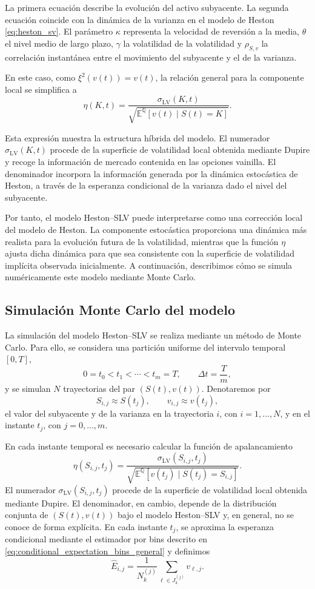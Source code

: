La primera ecuación describe la evolución del activo subyacente. La segunda ecuación coincide con la dinámica de la varianza en el modelo de Heston \ref{eq:heston_sv}. El parámetro \(\kappa\) representa la velocidad de reversión a la media, \(\theta\) el nivel medio de largo plazo, \(\gamma\) la volatilidad de la volatilidad y \(\rho_{S,v}\) la correlación instantánea entre el movimiento del subyacente y el de la varianza.

En este caso, como \(\xi^2(v(t))=v(t)\), la relación general para la componente local se simplifica a
\begin{equation}
\label{eq:heston_slv_leverage}
\eta(K,t)
=
\frac{
\sigma_{\mathrm{LV}}(K,t)
}{
\sqrt{
\mathbb{E}^{\mathbb{Q}}
\left[
v(t)\mid S(t)=K
\right]
}
}.
\end{equation}

Esta expresión muestra la estructura híbrida del modelo. El numerador \(\sigma_{\mathrm{LV}}(K,t)\) procede de la superficie de volatilidad local obtenida mediante Dupire y recoge la información de mercado contenida en las opciones vainilla. El denominador incorpora la información generada por la dinámica estocástica de Heston, a través de la esperanza condicional de la varianza dado el nivel del subyacente.

Por tanto, el modelo Heston--SLV puede interpretarse como una corrección local del modelo de Heston. La componente estocástica proporciona una dinámica más realista para la evolución futura de la volatilidad, mientras que la función \(\eta\) ajusta dicha dinámica para que sea consistente con la superficie de volatilidad implícita observada inicialmente. A continuación, describimos cómo se simula numéricamente este modelo mediante Monte Carlo.

\subsection{Simulación Monte Carlo del modelo}

La simulación del modelo Heston--SLV se realiza mediante un método de Monte Carlo. Para ello, se considera una partición uniforme del intervalo temporal \([0,T]\),
\[
0=t_0<t_1<\cdots<t_m=T,
\qquad
\Delta t=\frac{T}{m},
\]
y se simulan \(N\) trayectorias del par \((S(t),v(t))\). Denotaremos por
\[
S_{i,j}\approx S(t_j),
\qquad
v_{i,j}\approx v(t_j),
\]
el valor del subyacente y de la varianza en la trayectoria \(i\), con \(i=1,\ldots,N\), y en el instante \(t_j\), con \(j=0,\ldots,m\).

En cada instante temporal es necesario calcular la función de apalancamiento
\[
\eta(S_{i,j},t_j)
=
\frac{
\sigma_{\mathrm{LV}}(S_{i,j},t_j)
}{
\sqrt{
\mathbb{E}^{\mathbb{Q}}
\left[
v(t_j)\mid S(t_j)=S_{i,j}
\right]
}
}.
\]
El numerador \(\sigma_{\mathrm{LV}}(S_{i,j},t_j)\) procede de la superficie de volatilidad local obtenida mediante Dupire. El denominador, en cambio, depende de la distribución conjunta de \((S(t),v(t))\) bajo el modelo Heston--SLV y, en general, no se conoce de forma explícita.
En cada instante \(t_j\), se aproxima la esperanza condicional mediante el estimador por bins descrito en \ref{eq:conditional_expectation_bins_general} y definimos
\[
\widehat{E}_{i,j}
=
\frac{1}{N_k^{(j)}}
\sum_{\ell\in J_k^{(j)}} v_{\ell,j}.
\]

